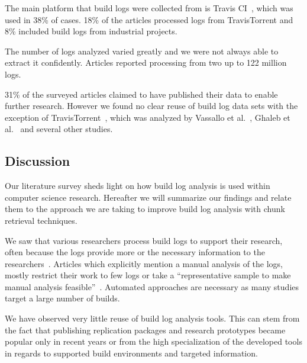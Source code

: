 The main platform that build logs were collected from is Travis
CI~\cite{travisci2019webpage},
which was used in 38\% of cases.
18\% of the articles processed logs from TravisTorrent and 8\% included
build logs from industrial projects.

The number of logs analyzed varied greatly and we were not always able to
extract it confidently.
Articles reported processing from two up to 122 million logs.

31\% of the surveyed articles claimed to have published their data to
enable further research.
However we found no clear reuse of build log data sets with the
exception of TravisTorrent~\cite{beller2017travistorrent}, which was
analyzed by Vassallo et al.~\cite{vassallo2017a-tale},
Ghaleb et al.~\cite{ghaleb2019studying} and several other studies.

\subsection{Discussion}
\label{sec:lit-sur:discussion}
Our literature survey sheds light on how build log analysis is used within
computer science research.
Hereafter we will summarize our findings and relate them to the
approach we are taking to improve build log analysis with chunk
retrieval techniques.

We saw that various researchers process build logs to support their
research, often because the logs provide more or the necessary information
to the researchers~\cite{ren2018automated}.
Articles which explicitly mention a manual analysis of
the logs, mostly restrict their work to few logs or take a
``representative sample to make manual analysis
feasible''~\cite{zolfagharinia2017not}.
Automated approaches are necessary as many studies target a large
number of builds.

We have observed very little reuse of build log analysis tools.
This can stem from the fact that publishing replication packages and
research prototypes became popular only in recent years or from the
high specialization of the developed tools in regards to supported
build environments and targeted information.

